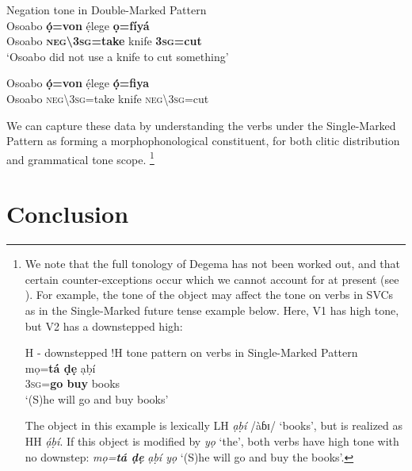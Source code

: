 \documentclass[output=paper]{langsci/langscibook}
\begin{document}
\ea\label{ex:rolle:negdp}
{Negation tone in Double-Marked Pattern}\\
   \ea\label{ex:rolle:53}
\gll   Osoabo   \textbf{\'ọ=von}       ẹ́lege   \textbf{ọ=fíyá}\\
     Osoabo   \textbf{\textsc{neg{\textbackslash}3sg}=take}   knife   \textbf{3\textsc{sg}=cut}\\
\glt ‘Osoabo did not use a knife to cut something’ \citep[111]{Kari2004}

\ex\label{ex:rolle:54}
\gll   *Osoabo  \textbf{ọ́=von}       ẹ́lege   \textbf{ọ́=fiya}\\
     Osoabo   \textsc{neg{\textbackslash}3sg}=take   knife   \textsc{neg{\textbackslash}}3\textsc{sg}=cut\\
\z
\z 

We can capture these data by understanding the verbs under the Single-Marked Pattern as forming a morphophonological constituent, for both clitic distribution and grammatical tone scope.%
\footnote{We 
  note that the full tonology of Degema has not been worked out, and that certain counter-exceptions occur which we cannot account for at present (see \citealt{Rolle2015}). For example, the tone of the object may affect the tone on verbs in SVCs as in the Single-Marked future tense example below. Here, V1 has high tone, but V2 has a downstepped high:

  \ea
  H - downstepped !H tone pattern on verbs in Single-Marked Pattern\\
  \gll \textup{mọ=\textbf{tá    ḍẹ}   ạḅí}\\
  3\textsc{sg}=\textbf{go  buy}   books\\
  \glt ‘(S)he will go and buy books’ 
  \z 


  The object in this example is lexically LH \textit{ạḅí} /àɓɪ/ ‘books’, but is realized as HH \textit{ạ́ḅí}. If this object is modified by \textit{yọ} ‘the’, both verbs have high tone with no downstep: \textit{mọ=}\textbf{\textit{tá ḍẹ}} \textit{ạḅí yọ} ‘(S)he will go and buy the books’. 
}

\section{Conclusion}
\end{document}

